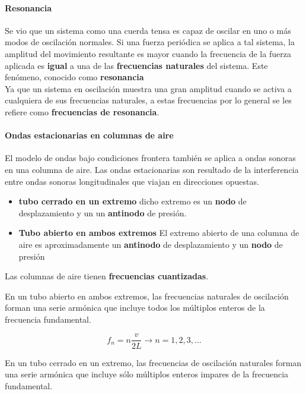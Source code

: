 \documentclass[10pt]{article}
\begin{document}
\paragraph{Resonancia}
Se vio que un sistema como una cuerda tensa es capaz de oscilar en uno o más modos
de oscilación normales. Si una fuerza periódica se aplica a tal sistema, la amplitud del
movimiento resultante es mayor cuando la frecuencia de la fuerza aplicada es \textbf{igual} a una
de las \textbf{frecuencias naturales} del sistema. Este fenómeno, conocido como \textbf{resonancia}\\
\linebreak
Ya que un sistema en oscilación muestra una gran amplitud cuando se activa a cualquiera de sus
frecuencias naturales, a estas frecuencias por lo general se les refiere como \textbf{frecuencias
de resonancia}.

\paragraph{Ondas estacionarias en columnas de aire}
El modelo de ondas bajo condiciones frontera también se aplica a ondas sonoras en una
columna de aire. Las ondas estacionarias son resultado de la interferencia entre ondas sonoras longitudinales que
viajan en direcciones opuestas.\\
\begin{itemize}
	\item \textbf{tubo cerrado en un extremo} dicho extremo es un \textbf{nodo} de desplazamiento y un  un \textbf{antinodo} de
presión.
	\item \textbf{Tubo abierto en ambos extremos} El extremo abierto de una columna de aire es aproximadamente un \textbf{antinodo} de desplazamiento y un \textbf{nodo} de presión
\end{itemize}

Las columnas de aire tienen \textbf{frecuencias cuantizadas}.
\begin{center}
	En un tubo abierto en ambos extremos, las frecuencias naturales de oscilación forman una serie armónica que incluye todos los múltiplos enteros de la frecuencia
fundamental.
\end{center}

\begin{equation*}
	f_n = n\dfrac{v}{2L} \rightarrow n = 1,2,3,...
\end{equation*}

\begin{center}
	En un tubo cerrado en un extremo, las frecuencias de oscilación naturales forman
una serie armónica que incluye sólo múltiplos enteros impares de la frecuencia
fundamental.
\end{center}
\end{document}
